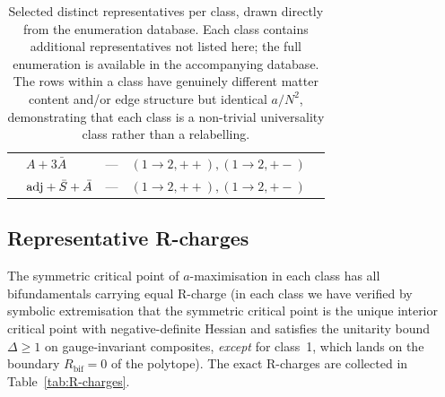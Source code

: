 \begin{table}[h]
\begin{tabular}{cllll}
         & $A+3\bar A$                 & ---                       & $(1\!\to\!2,++),(1\!\to\!2,+-)$ \\
         & $\mathrm{adj}+\bar S+\bar A$        & ---                       & $(1\!\to\!2,++),(1\!\to\!2,+-)$ \\
    \bottomrule
  \end{tabular}
  \caption{Selected distinct representatives per class, drawn
    directly from the enumeration database.  Each class contains
    additional representatives not listed here; the full enumeration
    is available in the accompanying database.  The rows within a
    class have genuinely different matter content and/or edge
    structure but identical $a/N^{2}$, demonstrating that each class
    is a non-trivial universality class rather than a relabelling.}
  \label{tab:class-reps}
\end{table}

\subsection{Representative R-charges}
\label{sec:class-rcharges}

The symmetric critical point of $a$-maximisation in each class has
all bifundamentals carrying equal R-charge (in each class we have
verified by symbolic extremisation that the symmetric critical point
is the unique interior critical point with negative-definite Hessian
and satisfies the unitarity bound $\Delta\ge 1$ on gauge-invariant
composites, \emph{except} for class~1, which lands on the boundary
$R_{\text{bif}}=0$ of the polytope).  The exact R-charges are
collected in Table~\ref{tab:R-charges}.

